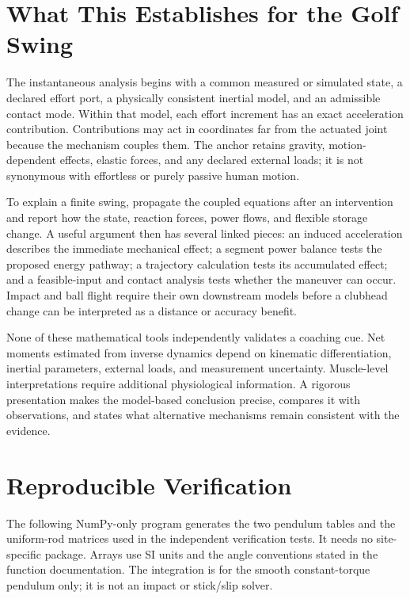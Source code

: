 \section{What This Establishes for the Golf Swing}

The instantaneous analysis begins with a common measured or simulated state, a declared effort port, a physically consistent inertial model, and an admissible contact mode. Within that model, each effort increment has an exact acceleration contribution. Contributions may act in coordinates far from the actuated joint because the mechanism couples them. The anchor retains gravity, motion-dependent effects, elastic forces, and any declared external loads; it is not synonymous with effortless or purely passive human motion.

To explain a finite swing, propagate the coupled equations after an intervention and report how the state, reaction forces, power flows, and flexible storage change. A useful argument then has several linked pieces: an induced acceleration describes the immediate mechanical effect; a segment power balance tests the proposed energy pathway; a trajectory calculation tests its accumulated effect; and a feasible-input and contact analysis tests whether the maneuver can occur. Impact and ball flight require their own downstream models before a clubhead change can be interpreted as a distance or accuracy benefit.

None of these mathematical tools independently validates a coaching cue. Net moments estimated from inverse dynamics depend on kinematic differentiation, inertial parameters, external loads, and measurement uncertainty. Muscle-level interpretations require additional physiological information. A rigorous presentation makes the model-based conclusion precise, compares it with observations, and states what alternative mechanisms remain consistent with the evidence.

\section{Reproducible Verification}

The following NumPy-only program generates the two pendulum tables and the uniform-rod matrices used in the independent verification tests. It needs no site-specific package. Arrays use SI units and the angle conventions stated in the function documentation. The integration is for the smooth constant-torque pendulum only; it is not an impact or stick/slip solver.

